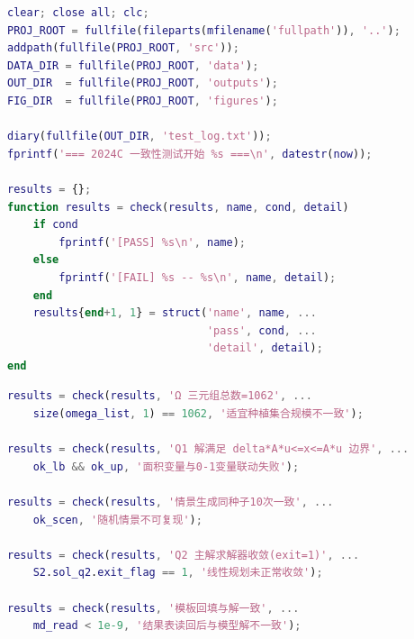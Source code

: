 \begin{lstlisting}[style=matlabstyle,language=Matlab]
% tests/test_planting.m：测试入口与检查函数
clear; close all; clc;
PROJ_ROOT = fullfile(fileparts(mfilename('fullpath')), '..');
addpath(fullfile(PROJ_ROOT, 'src'));
DATA_DIR = fullfile(PROJ_ROOT, 'data');
OUT_DIR  = fullfile(PROJ_ROOT, 'outputs');
FIG_DIR  = fullfile(PROJ_ROOT, 'figures');

diary(fullfile(OUT_DIR, 'test_log.txt'));
fprintf('=== 2024C 一致性测试开始 %s ===\n', datestr(now));

results = {};
function results = check(results, name, cond, detail)
    if cond
        fprintf('[PASS] %s\n', name);
    else
        fprintf('[FAIL] %s -- %s\n', name, detail);
    end
    results{end+1, 1} = struct('name', name, ...
                               'pass', cond, ...
                               'detail', detail);
end
\end{lstlisting}

\begin{lstlisting}[style=matlabstyle,language=Matlab]
% tests/test_planting.m：代表性测试项目
results = check(results, 'Ω 三元组总数=1062', ...
    size(omega_list, 1) == 1062, '适宜种植集合规模不一致');

results = check(results, 'Q1 解满足 delta*A*u<=x<=A*u 边界', ...
    ok_lb && ok_up, '面积变量与0-1变量联动失败');

results = check(results, '情景生成同种子10次一致', ...
    ok_scen, '随机情景不可复现');

results = check(results, 'Q2 主解求解器收敛(exit=1)', ...
    S2.sol_q2.exit_flag == 1, '线性规划未正常收敛');

results = check(results, '模板回填与解一致', ...
    md_read < 1e-9, '结果表读回后与模型解不一致');
\end{lstlisting}
